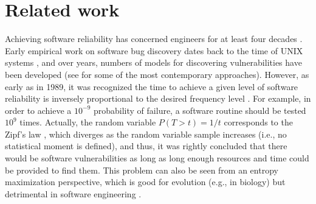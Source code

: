 \section{Related work}
\label{sec:related}
Achieving software reliability has concerned engineers for at least four decades \cite{littlewood1973bayesian,adams1984textordfeminineoptimizing,littlewood1989predicting}. Early empirical work on software bug discovery dates back to the time of UNIX systems \cite{miller1990empirical}, and over years, numbers of models for discovering vulnerabilities have been developed (see \cite{yamaguchi2014modeling,zhao2016empirical} for some of the most contemporary approaches). However, as early as in 1989, it was recognized the time to achieve a given level of software reliability is inversely proportional to the desired frequency level \cite{adams1984textordfeminineoptimizing}. For example, in order to achieve a $10^{-9}$ probability of failure, a software routine should be tested  $10^{9}$ times. Actually, the random variable $P(T > t) = 1/t$ corresponds to the Zipf's law \cite{maillart2008empirical,saichev2009theory}, which diverges as the random variable sample increases (i.e., no statistical moment is defined), and thus, it was rightly concluded that there would be software vulnerabilities as long as long enough resources and time could be provided to find them. This problem can also be seen from an entropy maximization perspective, which is good for evolution (e.g., in biology) but detrimental in software engineering \cite{brady1999murphy}. \\

